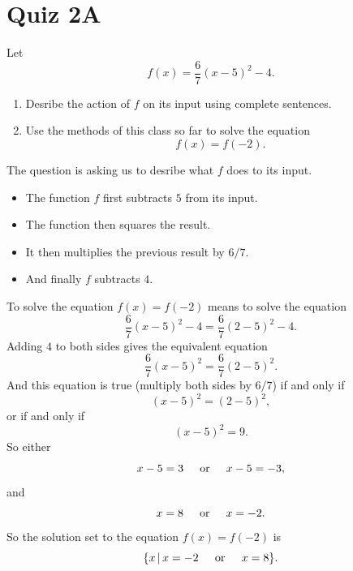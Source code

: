 \documentclass{ximera}
\begin{document}
\section{Quiz 2A}
\begin{question} \label{Qpv3ffg}
 Let
\[
     f(x) = \frac{6}{7} \left( x - 5 \right)^2 - 4 .
\]

\begin{enumerate}
\item Desribe the action of $f$ on its input using complete sentences.

\item Use the methods of this class so far to solve the equation
\[
     f(x) = f(-2) .
\]
\end{enumerate}

\begin{explanation}
\item The question is asking us to desribe what $f$ does to its input. 
\begin{itemize}
\item The function $f$ first subtracts $5$ from its input.

\item The function then squares the result.

\item It then multiplies the previous result by $6/7$.

\item And finally $f$ subtracts $4$.
\end{itemize}

\item To solve the equation $f(x) = f(-2)$ means to solve the equation
\[
       \frac{6}{7} \left( x - 5 \right)^2 - 4 = \frac{6}{7} \left( 2 - 5 \right)^2 - 4 .
\]
Adding $4$ to both sides gives the equivalent equation
\[
  \frac{6}{7} \left( x - 5 \right)^2 = \frac{6}{7} \left( 2 - 5 \right)^2 .
\]
And this equation is true (multiply both sides by $6/7$) if and only if
\[
   \left( x - 5 \right)^2 = \left( 2 - 5 \right)^2 ,
\] 
or if and only if
\[
  (x-5)^2 = 9 .
\]
So either 
\[
   x-5 = 3 \hskip 0.2 in \text{or} \hskip 0.2 in x-5 = -3,
\]
and
\[
      x = 8 \hskip 0.2 in \text{or} \hskip 0.2 in x= -2.
\]
So the solution set to the equation $f(x)=f(-2)$ is
\[
   \{  x \, |  \, x=-2 \hskip 0.2 in \text{or} \hskip 0.2 in x=8 \}.
\]
\end{explanation}
\end{question}
\end{document}
